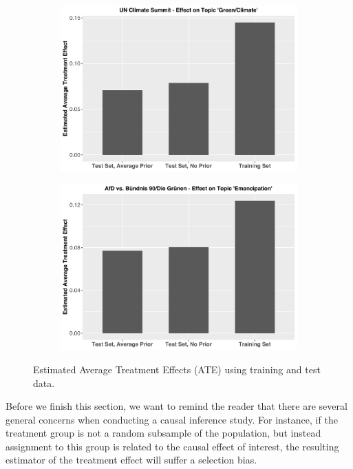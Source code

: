 \begin{figure}[h!]
  \centering
  \captionsetup{justification=centering,margin=2cm}
  \begin{subfigure}[b]{0.49\linewidth}
    \includegraphics[width=\linewidth]{../plots/4_7/climate_summit_ate.pdf}
  \end{subfigure}
  \begin{subfigure}[b]{0.49\linewidth}
    \includegraphics[width=\linewidth]{../plots/4_7/emancipation_ate.pdf}
  \end{subfigure}
  \caption{Estimated Average Treatment Effects (ATE) using training and test data.}
  \label{fig:causal_inference_ate}
\end{figure}

Before we finish this section, we want to remind the reader that there are several general concerns when conducting a causal inference study. For instance, if the treatment group is not a random subsample of the population, but instead assignment to this group is related to the causal effect of interest, the resulting estimator of the treatment effect will suffer a selection bias.